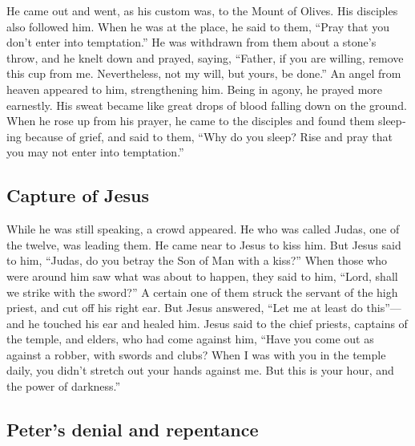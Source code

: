 \begin{paracol}{2}
\begin{otherlanguage}{english}
\begin{otherlanguage}{english}
 He came out and went, as his custom was, to the Mount of
Olives. His disciples also followed him.  When he was at
the place, he said to them, ``Pray that you don't enter into
temptation.''  He was withdrawn from them about a stone's
throw, and he knelt down and prayed,  saying, ``Father,
if you are willing, remove this cup from me. Nevertheless, not my will,
but yours, be done.''  An angel from heaven appeared to
him, strengthening him.  Being in agony, he prayed more
earnestly. His sweat became like great drops of blood falling down on
the ground.  When he rose up from his prayer, he came to
the disciples and found them sleeping because of grief, 
and said to them, ``Why do you sleep? Rise and pray that you may not
enter into temptation.''

\hypertarget{capture-of-jesus}{%
\subsection{Capture of Jesus}\label{capture-of-jesus}}

 While he was still speaking, a crowd appeared. He who
was called Judas, one of the twelve, was leading them. He came near to
Jesus to kiss him.  But Jesus said to him, ``Judas, do
you betray the Son of Man with a kiss?''  When those who
were around him saw what was about to happen, they said to him, ``Lord,
shall we strike with the sword?''  A certain one of them
struck the servant of the high priest, and cut off his right ear.
 But Jesus answered, ``Let me at least do this''---and he
touched his ear and healed him.  Jesus said to the chief
priests, captains of the temple, and elders, who had come against him,
``Have you come out as against a robber, with swords and clubs?
 When I was with you in the temple daily, you didn't
stretch out your hands against me. But this is your hour, and the power
of darkness.''

\hypertarget{peters-denial-and-repentance}{%
\subsection{Peter's denial and
repentance}\label{peters-denial-and-repentance}}


\end{otherlanguage}
\end{otherlanguage}
\end{paracol}
